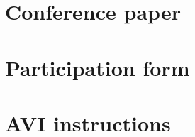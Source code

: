 
\chapter{Conference paper}
\cleardoublepage
\label{apx:conference_paper}


\chapter{Participation form}
\cleardoublepage
\label{apx:participation_form}


\chapter{AVI instructions}
\cleardoublepage
\label{apx:video_recording_instructions}


